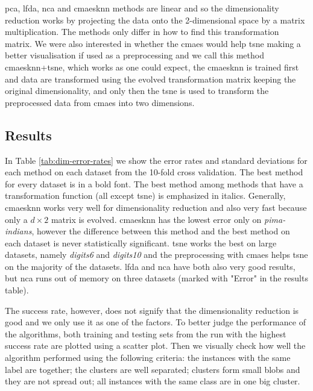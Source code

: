 \documentclass[12pt,a4paper]{report}
\begin{document}
\ac{pca}, \ac{lfda}, \ac{nca} and \ac{cmaesknn} methods are linear and so the dimensionality reduction works by projecting the data onto the 2-dimensional space by a matrix multiplication. The methods only differ in how to find this transformation matrix. We were also interested in whether the \ac{cmaes} would help \ac{tsne} making a better visualisation if used as a preprocessing and we call this method \ac{cmaesknn}+\ac{tsne}, which works as one could expect, the \ac{cmaesknn} is trained first and data are transformed using the evolved transformation matrix keeping the original dimensionality, and only then the \ac{tsne} is used to transform the preprocessed data from \ac{cmaes} into two dimensions.

\subsection{Results}

In Table \ref{tab:dim-error-rates} we show the error rates and standard deviations for each method on each dataset from the 10-fold cross validation. The best method for every dataset is in a bold font. The best method among methods that have a transformation function (all except \ac{tsne}) is emphasized in italics. Generally, \ac{cmaesknn} works very well for dimensionality reduction and also very fast because only a $d\times2$ matrix is evolved. \ac{cmaesknn} has the lowest error only on \textit{pima-indians}, however the difference between this method and the best method on each dataset is never statistically significant. \ac{tsne} works the best on large datasets, namely \textit{digits6} and \textit{digits10} and the preprocessing with \ac{cmaes} helps \ac{tsne} on the majority of the datasets. \ac{lfda} and \ac{nca} have both also very good results, but \ac{nca} runs out of memory on three datasets (marked with "Error" in the results table).



The success rate, however, does not signify that the dimensionality reduction is good and we only use it as one of the factors. To better judge the performance of the algorithms, both training and testing sets from the run with the highest success rate are plotted using a scatter plot. Then we visually check how well the algorithm performed using the following criteria: the instances with the same label are together; the clusters are well separated; clusters form small blobs and they are not spread out; all instances with the same class are in one big cluster.
\end{document}
